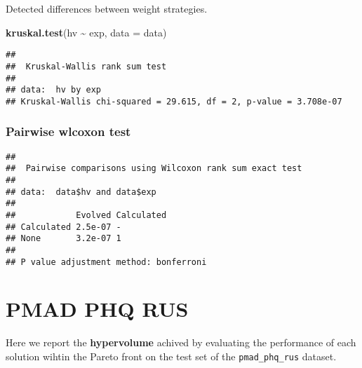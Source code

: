 \documentclass[
]{book}
\newenvironment{Shaded}{\begin{snugshade}}{\end{snugshade}}
\newcommand{\AttributeTok}[1]{\textcolor[rgb]{0.13,0.29,0.53}{#1}}
\newcommand{\ConstantTok}[1]{\textcolor[rgb]{0.56,0.35,0.01}{#1}}
\newcommand{\FunctionTok}[1]{\textcolor[rgb]{0.13,0.29,0.53}{\textbf{#1}}}
\newcommand{\NormalTok}[1]{#1}
\newcommand{\SpecialCharTok}[1]{\textcolor[rgb]{0.81,0.36,0.00}{\textbf{#1}}}
\newcommand{\StringTok}[1]{\textcolor[rgb]{0.31,0.60,0.02}{#1}}
\begin{document}
Detected differences between weight strategies.

\begin{Shaded}
\begin{Highlighting}[]
\FunctionTok{kruskal.test}\NormalTok{(hv }\SpecialCharTok{\textasciitilde{}}\NormalTok{ exp, }\AttributeTok{data =}\NormalTok{ data)}
\end{Highlighting}
\end{Shaded}

\begin{verbatim}
## 
##  Kruskal-Wallis rank sum test
## 
## data:  hv by exp
## Kruskal-Wallis chi-squared = 29.615, df = 2, p-value = 3.708e-07
\end{verbatim}

\hypertarget{pairwise-wlcoxon-test-12}{%
\subsection{Pairwise wlcoxon test}\label{pairwise-wlcoxon-test-12}}

\begin{Shaded}
\end{Shaded}

\begin{verbatim}
## 
##  Pairwise comparisons using Wilcoxon rank sum exact test 
## 
## data:  data$hv and data$exp 
## 
##            Evolved Calculated
## Calculated 2.5e-07 -         
## None       3.2e-07 1         
## 
## P value adjustment method: bonferroni
\end{verbatim}

\hypertarget{pmad-phq-rus}{%
\chapter{PMAD PHQ RUS}\label{pmad-phq-rus}}

Here we report the \textbf{hypervolume} achived by evaluating the performance of each solution wihtin the Pareto front on the test set of the \texttt{pmad\_phq\_rus} dataset.
\end{document}
